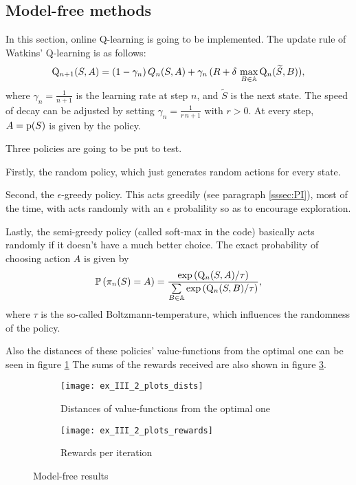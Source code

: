 
\subsection{Model-free methods}\label{ssec:model-free}

In this section, online Q-learning is going to be implemented.
The update rule of Watkins' Q-learning is as follows:
\begin{equation}
	\mathrm{Q}_{n+1}(S,A)=(1-\gamma_n)\,Q_n(S, A) + \gamma_n\,(R + \delta\,\max\limits_{B\in\mathbb{A}}\mathrm{Q}_n(\widetilde{S},B)),
\end{equation}
where $\gamma_n=\frac{1}{n+1}$ is the learning rate at step $n$,
and $\widetilde{S}$ is the next state. The speed of decay can be adjusted by setting
$\gamma_n=\frac{1}{r\,n+1}$ with $r>0$.
At every step, $A=\mathrm{p}(S)$ is given by the policy.

Three policies are going to be put to test.

Firstly, the random policy, which just generates random actions for every state.

Second, the $\epsilon$-greedy policy. This acts greedily (see paragraph \ref{sssec:PI}),
most of the time, with acts randomly with an $\epsilon$ probalility so as to
encourage exploration.

Lastly, the semi-greedy policy (called soft-max in the code) basically acts randomly
if it doesn't have a much better choice. The exact probability of choosing action $A$
is given by
\begin{equation}
	\mathbb{P}\left(\pi_n(S)=A\right) =
	\frac{\exp\left(\mathrm{Q}_n(S, A)/\tau\right)}
	{\sum\limits_{B\in\mathbb{A}}\exp\left(\mathrm{Q}_n(S, B)/\tau\right)},
\end{equation}
where $\tau$ is the so-called Boltzmann-temperature, which influences
the randomness of the policy.

Also the distances of these policies' value-functions from the optimal one
can be seen in figure \ref{fig:dist-2}
The sums of the rewards received are also shown in figure \ref{fig:rewards}.

\begin{figure}[H]
	\centering
	\begin{subfigure}{.45\textwidth}
		\centering
		\texttt{[image: ex\_III\_2\_plots\_dists]}
		\caption{Distances of value-functions from the optimal one}
		\label{fig:dist-2}
	\end{subfigure}
	\begin{subfigure}{.45\textwidth}
		\centering
		\texttt{[image: ex\_III\_2\_plots\_rewards]}
		\caption{Rewards per iteration}
		\label{fig:rewards}
	\end{subfigure}
	\caption{Model-free results}
\end{figure}


